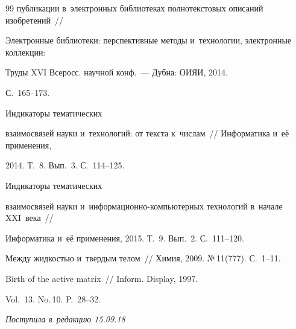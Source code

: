 {{\begin{thebibliography}{99}
публикации в~электронных библиотеках полнотекстовых описаний изобретений~/\!\!/ 


Электронные библиотеки: перспективные методы и~технологии, электронные коллекции: 


Труды XVI Всеросс. научной конф.~--- Дубна: ОИЯИ, 2014. 


С.~165--173.






Индикаторы тематических 


взаимосвязей науки и~технологий: от текста к~числам~/\!\!/ Информатика и~её применения, 


2014. Т.~8. Вып.~3. С.~114--125.






Индикаторы тематических 


взаимосвязей науки и~ин\-фор\-ма\-ци\-он\-но-ком\-пью\-тер\-ных технологий в~начале XXI~века~/\!\!/ 


Информатика и~её применения, 2015. Т.~9. Вып.~2. С.~111--120.




 Между жидкостью и~твердым телом~/\!\!/ Химия, 2009. №\,11(777). С.~1--11.




 Birth of the active matrix~/\!\!/ Inform. Display, 1997. 


Vol.~13. No.\,10. P.~28--32.


        \end{thebibliography}


} }








\vspace*{-3pt}





\hfill{\small\textit{Поступила в~редакцию 15.09.18}}



















